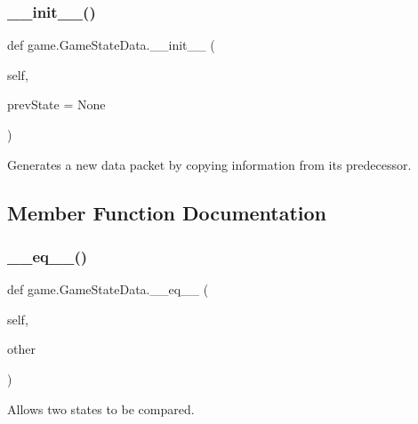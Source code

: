 \subsubsection{\texorpdfstring{\+\_\+\+\_\+init\+\_\+\+\_\+()}{\_\_init\_\_()}}
{\footnotesize\ttfamily def game.\+Game\+State\+Data.\+\_\+\+\_\+init\+\_\+\+\_\+ (\begin{DoxyParamCaption}\item[{}]{self,  }\item[{}]{prev\+State = {\ttfamily None} }\end{DoxyParamCaption})}

\begin{DoxyVerb}Generates a new data packet by copying information from its predecessor.
\end{DoxyVerb}
 

\subsection{Member Function Documentation}
\mbox{\label{classgame_1_1_game_state_data_ab9100acd3f840cbe9bdf8a40eda19e73}} 
\subsubsection{\texorpdfstring{\+\_\+\+\_\+eq\+\_\+\+\_\+()}{\_\_eq\_\_()}}
{\footnotesize\ttfamily def game.\+Game\+State\+Data.\+\_\+\+\_\+eq\+\_\+\+\_\+ (\begin{DoxyParamCaption}\item[{}]{self,  }\item[{}]{other }\end{DoxyParamCaption})}

\begin{DoxyVerb}Allows two states to be compared.
\end{DoxyVerb}
 \mbox{\label{classgame_1_1_game_state_data_a206fb476b979a446a4f11e3b0b0b8e23}} 
